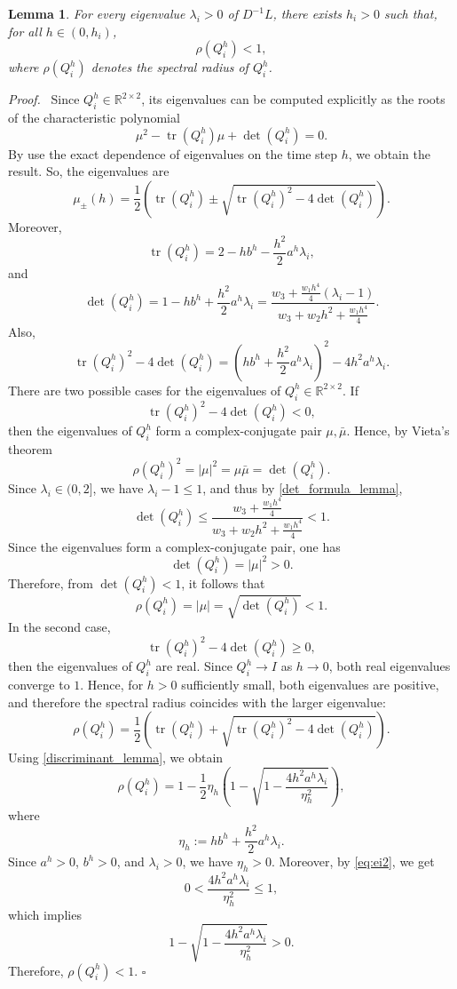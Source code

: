 \documentclass[letterpaper,journal]{IEEEtran}
\newtheorem{lemma}{Lemma}
\newenvironment{proof}{\par\noindent\textit{Proof.}\ }{\hfill$\square$\par}
\begin{document}
\begin{lemma}\label{lemma:rho}
For every eigenvalue \(\lambda_i>0\) of \(D^{-1}L\), there exists \(h_i>0\) such that, for all
\(h\in(0,h_i)\),
\[
\rho(Q_i^h)<1,
\]
where \(\rho(Q_i^h)\) denotes the spectral radius of \(Q_i^h\).
\end{lemma}
\begin{proof} 
Since \(Q_i^h \in \mathbb{R}^{2\times 2}\), its eigenvalues can be computed explicitly as the roots of the characteristic polynomial
\[
\mu^2 - \operatorname{tr}(Q_i^h)\mu + \det(Q_i^h) = 0.
\]
By use the exact dependence of eigenvalues on the time step \(h\), we obtain the  result.
So, the eigenvalues are 
\[
\mu_{\pm}(h)
=
\frac12\left(
\operatorname{tr}(Q_i^h)\pm
\sqrt{\operatorname{tr}(Q_i^h)^2-4\det(Q_i^h)}
\right).
\]
Moreover,
\[
\operatorname{tr}(Q_i^h)=2-hb^h-\frac{h^2}{2}a^h\lambda_i,
\]
and
\begin{equation}\label{det_formula_lemma}
\det(Q_i^h)
=
1-hb^h+\frac{h^2}{2}a^h\lambda_i
=
\frac{w_3+\frac{w_1h^4}{4}(\lambda_i-1)}
{w_3+w_2h^2+\frac{w_1h^4}{4}}.
\end{equation}
Also,
\begin{equation}\label{discriminant_lemma}
\operatorname{tr}(Q_i^h)^2-4\det(Q_i^h)
=
\left(hb^h+\frac{h^2}{2}a^h\lambda_i\right)^2-4h^2a^h\lambda_i.
\end{equation}
There are two possible cases for the eigenvalues of  \(Q_i^h \in \mathbb{R}^{2\times 2}\). If
\[
\operatorname{tr}(Q^{h}_{i})^2 - 4 \det(Q^{h}_{i}) <0,
\]
then the eigenvalues of $Q^{h}_{i}$ form a complex-conjugate pair
$\mu,\bar\mu$. Hence, by Vieta's theorem
\[
\rho(Q^{h}_{i})^2 = |\mu|^2 = \mu\bar\mu = \det(Q^{h}_{i}).
\]
Since \(\lambda_i\in(0,2]\), we have \(\lambda_i-1\le1\), and thus by \eqref{det_formula_lemma},
\[
\det(Q_i^h)
\le
\frac{w_3+\frac{w_1h^4}{4}}
{w_3+w_2h^2+\frac{w_1h^4}{4}}
<1.
\]
Since the eigenvalues form a complex-conjugate pair, one has
\[
\det(Q_i^h)=|\mu|^2>0.
\]
Therefore, from \(\det(Q_i^h)<1\), it follows that
\[
\rho(Q_i^h)=|\mu|=\sqrt{\det(Q_i^h)}<1.
\]
In the second case,
\begin{equation}
    \label{eq:ei2}
    \operatorname{tr}(Q_i^h)^2-4\det(Q_i^h)\ge 0,
\end{equation}
then the eigenvalues of $Q_i^h$ are real.  Since \(Q_i^h\to I\) as \(h\to0\), both real eigenvalues converge to \(1\). Hence, for \(h>0\) sufficiently small, both eigenvalues are positive, and therefore the spectral radius coincides with the larger eigenvalue:
\[
\rho(Q_i^h)
=
\frac12\left(
\operatorname{tr}(Q_i^h)+
\sqrt{\operatorname{tr}(Q_i^h)^2-4\det(Q_i^h)}
\right).
\]
Using \eqref{discriminant_lemma}, we obtain
\[
\rho(Q_i^h)
=
1-\frac12\eta_h
\left(
1-\sqrt{1-\frac{4h^2a^h\lambda_i}{\eta_h^2}}
\right),
\]
where
\[
\eta_h:=hb^h+\frac{h^2}{2}a^h\lambda_i.
\]
Since \(a^h>0\), \(b^h>0\), and \(\lambda_i>0\), we have \(\eta_h>0\). Moreover,  by \eqref{eq:ei2}, we get
\[
0<
\frac{4h^2a^h\lambda_i}{\eta_h^2}
\le1,
\]
which implies
\[
1-\sqrt{1-\frac{4h^2a^h\lambda_i}{\eta_h^2}}>0.
\]
Therefore, \(\rho(Q_i^h)<1\).
\end{proof}
\end{document}
